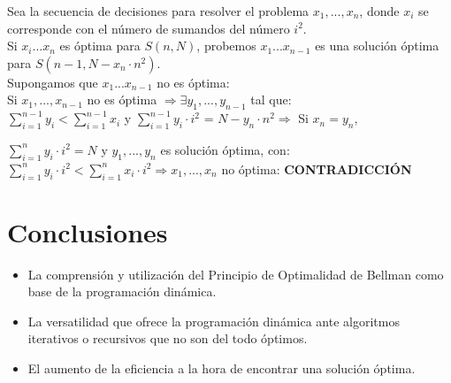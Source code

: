 \documentclass[a4paper,12pt,twoside]{article} %
\begin{document}
Sea la secuencia de decisiones para resolver el problema $x_1,...,x_n$, donde $x_i$ se corresponde con el número de sumandos del número  $i^2$.\\

Si $x_i ... x_n$ es óptima para $S(n,N)$, probemos $x_1 ... x_{n-1}$ es una solución óptima para $S(n-1,N-x_n \cdot n^2)$.\\

Supongamos que $x_1 ... x_{n-1}$ no es óptima:\\

Si $x_1,...,x_{n-1}$ no es óptima $\Longrightarrow \exists y_1,...,y_{n-1} $ tal que:\\

$\sum_{i=1}^{n-1} y_i < \sum_{i=1}^{n-1} x_i$ y 
$\sum_{i=1}^{n-1} y_i \cdot i^2$ = $N - y_n \cdot n^2 \Longrightarrow$ Si $x_n=y_n$,

$\sum_{i=1}^{n} y_i \cdot i^2 = N$ y $y_1,...,y_n$ es solución óptima, con:\\

$\sum_{i=1}^{n} y_i \cdot i^2 < \sum_{i=1}^{n} x_i \cdot i^2 \Longrightarrow x_1,...,x_n$ no óptima: \textbf{CONTRADICCIÓN}

\vspace{1cm}

\newpage

\section{Conclusiones} 

\begin{itemize}
	\item La comprensión y utilización del Principio de Optimalidad de Bellman como base de la programación dinámica.
	\item La versatilidad que ofrece la programación dinámica ante algoritmos iterativos o recursivos que no son del todo óptimos.
	\item El aumento de la eficiencia a la hora de encontrar una solución óptima.

\end{itemize}
\end{document}
